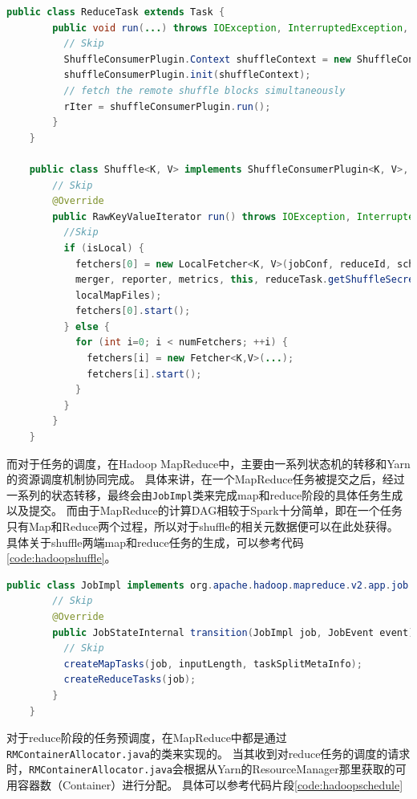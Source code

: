 \begin{lstlisting}[language={Java}, caption={Hadoop MapReduce中Reduce阶段的shuffle读代码片段}, label={code:hadoopreduce}]
    public class ReduceTask extends Task {
        public void run(...) throws IOException, InterruptedException, ClassNotFoundException {
          // Skip
          ShuffleConsumerPlugin.Context shuffleContext = new ShuffleConsumerPlugin.Context(...);
          shuffleConsumerPlugin.init(shuffleContext);
          // fetch the remote shuffle blocks simultaneously
          rIter = shuffleConsumerPlugin.run();
        }
    }

    public class Shuffle<K, V> implements ShuffleConsumerPlugin<K, V>, ExceptionReporter {
        // Skip
        @Override
        public RawKeyValueIterator run() throws IOException, InterruptedException {
          //Skip
          if (isLocal) {
            fetchers[0] = new LocalFetcher<K, V>(jobConf, reduceId, scheduler,
            merger, reporter, metrics, this, reduceTask.getShuffleSecret(),
            localMapFiles);
            fetchers[0].start();
          } else {
            for (int i=0; i < numFetchers; ++i) {
              fetchers[i] = new Fetcher<K,V>(...);
              fetchers[i].start();
            }
          }
        }
    }
\end{lstlisting}

而对于任务的调度，在Hadoop MapReduce中，主要由一系列状态机的转移和Yarn\cite{yarn}的资源调度机制协同完成。
具体来讲，在一个MapReduce任务被提交之后，经过一系列的状态转移，最终会由\verb|JobImpl|类来完成map和reduce阶段的具体任务生成以及提交。
而由于MapReduce的计算DAG相较于Spark十分简单，即在一个任务只有Map和Reduce两个过程，所以对于shuffle的相关元数据便可以在此处获得。
具体关于shuffle两端map和reduce任务的生成，可以参考代码\ref{code:hadoopshuffle}。

\begin{lstlisting}[language={Java}, caption={Hadoop MapReduce中shuffle元数据生成代码片段}, label={code:hadoopshuffle}]
    public class JobImpl implements org.apache.hadoop.mapreduce.v2.app.job.Job, EventHandler<JobEvent> {
        // Skip
        @Override
        public JobStateInternal transition(JobImpl job, JobEvent event) {
          // Skip
          createMapTasks(job, inputLength, taskSplitMetaInfo);
          createReduceTasks(job);
        }
    }
\end{lstlisting}

对于reduce阶段的任务预调度，在MapReduce中都是通过\verb|RMContainerAllocator.java|的类来实现的。
当其收到对reduce任务的调度的请求时，\verb|RMContainerAllocator.java|会根据从Yarn的ResourceManager那里获取的可用容器数（Container）进行分配。
具体可以参考代码片段\ref{code:hadoopschedule}

